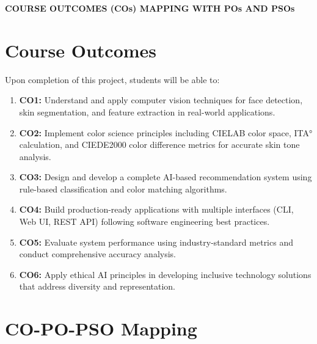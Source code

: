 \newpage
\thispagestyle{empty}
\begin{center}
\textbf{\Large COURSE OUTCOMES (COs) MAPPING WITH POs AND PSOs}
\end{center}

\vspace{0.5cm}

\section*{Course Outcomes}

Upon completion of this project, students will be able to:

\begin{enumerate}
    \item \textbf{CO1:} Understand and apply computer vision techniques for face detection, skin segmentation, and feature extraction in real-world applications.
    
    \item \textbf{CO2:} Implement color science principles including CIELAB color space, ITA° calculation, and CIEDE2000 color difference metrics for accurate skin tone analysis.
    
    \item \textbf{CO3:} Design and develop a complete AI-based recommendation system using rule-based classification and color matching algorithms.
    
    \item \textbf{CO4:} Build production-ready applications with multiple interfaces (CLI, Web UI, REST API) following software engineering best practices.
    
    \item \textbf{CO5:} Evaluate system performance using industry-standard metrics and conduct comprehensive accuracy analysis.
    
    \item \textbf{CO6:} Apply ethical AI principles in developing inclusive technology solutions that address diversity and representation.
\end{enumerate}

\vspace{1cm}

\section*{CO-PO-PSO Mapping}


